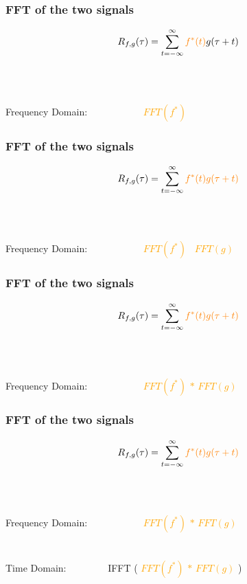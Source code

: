 \documentclass{beamer}
\begin{document}
\begin{frame}
\frametitle{FFT of the two signals}
\begin{displaymath}
R_{f,g}(\tau)= \sum_{ t = -\infty}^{\infty} \textcolor{orange}{  f^*(t)} g(\tau +t) %
\end{displaymath}
\ \\
\ \\
\ \\
Frequency Domain:  \ \ \ \ \ \ \ \ \ \ \ 
\textcolor{orange}{$FFT(f^*)$} 
\end{frame}


\begin{frame}
\frametitle{FFT of the two signals}
\begin{displaymath}
R_{f,g}(\tau)= \sum_{ t = -\infty}^{\infty} \textcolor{orange}{  f^*(t) g(\tau +t) }%
\end{displaymath}
\ \\
\ \\
\ \\
Frequency Domain:  \ \ \ \ \ \ \ \ \ \ \ 
\textcolor{orange}{$FFT(f^*)$ \ $FFT(g)$} 
\end{frame}


\begin{frame}
\frametitle{FFT of the two signals}
\begin{displaymath}
R_{f,g}(\tau)= \sum_{ t = -\infty}^{\infty} \textcolor{orange}{  f^*(t) g(\tau +t) }%
\end{displaymath}
\ \\
\ \\
\ \\
Frequency Domain:  \ \ \ \ \ \ \ \ \ \ \ 
\textcolor{orange}{$FFT(f^*)$ \textbf{$*$} $FFT(g)$} 
\end{frame}


\begin{frame}
\frametitle{FFT of the two signals}
\begin{displaymath}
R_{f,g}(\tau)= \sum_{ t = -\infty}^{\infty} \textcolor{orange}{  f^*(t) g(\tau +t) }%
\end{displaymath}
\ \\
\ \\
\ \\
Frequency Domain:  \ \ \ \ \ \ \ \ \ \ \ 
\textcolor{orange}{$FFT(f^*)$ \textbf{$*$} $FFT(g)$} 
\ \\
\ \\
\ \\
Time Domain: \ \ \ \ \ \ \ \  IFFT ( \textcolor{orange}{$FFT(f^*)$ \textbf{$*$} $FFT(g)$} )
\end{frame}
\end{document}
